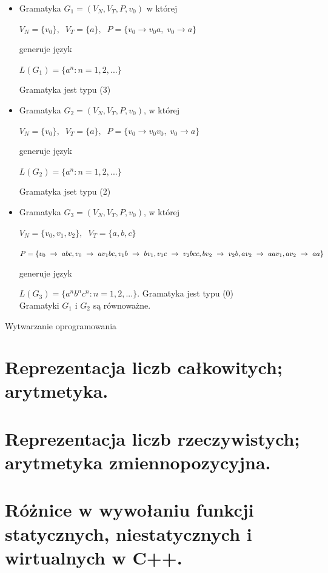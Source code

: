 \documentclass[12pt]{article}
\begin{document}
    \begin{itemize}
        \item Gramatyka $G_1 = (V_N,V_T,P,v_0)$ w której

        $V_N = \{v_0\}, \;\; V_T = \{a\}, \;\; P = \{ v_0 \rightarrow v_0a, \; v_0 \rightarrow a \}$

        generuje język

        $L(G_1) = \{ a^n : n = 1,2,... \}$

        Gramatyka jest typu (3)

        \item Gramatyka $G_2 = (V_N,V_T,P,v_0)$, w której

        $V_N = \{v_0\}, \;\; V_T = \{a\}, \;\; P = \{ v_0 \rightarrow v_0v_0, \; v_0 \rightarrow a \}$

        generuje język


        $L(G_2) = \{ a^n : n = 1,2,... \}$

        Gramatyka jset typu (2)


        \item Gramatyka $G_3 = (V_N,V_T,P,v_0)$, w której

        $V_N = \{v_0, v_1, v_2 \}, \;\; V_T = \{a,b,c\}$

        $P=\{v_0~\rightarrow~abc, v_0~\rightarrow~av_1bc, v_1b~\rightarrow~bv_1,v_1c~\rightarrow~v_2bcc, bv_2~\rightarrow~v_2b,  \\ av_2~\rightarrow~aav_1, av_2~\rightarrow~aa\}$

        generuje język

        $L(G_3) = \{ a^n b^n c^n : n = 1,2,... \}$.
        Gramatyka jest typu (0)
        \\

        Gramatyki $G_1$ i $G_2$ są równoważne.
    \end{itemize}

\newpage

    {\Large Wytwarzanie oprogramowania}

    \section{Reprezentacja liczb całkowitych; arytmetyka.}
    \section{Reprezentacja liczb rzeczywistych; arytmetyka zmiennopozycyjna.}
    \section{Różnice w wywołaniu funkcji statycznych, niestatycznych i wirtualnych w C++.}
\end{document}
